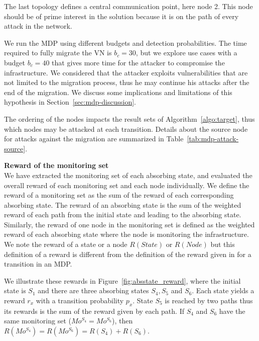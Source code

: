  The last topology defines a central communication point, here node 2. This node should be of prime interest in the solution because it is on the path of every attack in the network.



We run the MDP using different budgets and detection probabilities.
The time required to fully migrate the VN is $b_c=30$, but we explore use cases with a budget $b_c=40$ that gives more time for the attacker to compromise the infrastructure. We considered that the attacker exploits vulnerabilities that are not limited to the migration process, thus he may continue his attacks after the end of the migration. We discuss some implications and limitations of this hypothesis in Section~\ref{sec:mdp-discussion}.

The ordering of the nodes impacts the result sets of Algorithm~\ref{algo:target}, thus which nodes may be attacked at each transition.
Details about the source node for attacks against the migration are summarized in Table~\ref{tab:mdp-attack-source}.



\textbf{Reward of the monitoring set\\}
We have extracted the monitoring set of each absorbing state, and evaluated the overall reward of each monitoring set and each node individually.
We define the reward of a monitoring set as the sum of the reward of each corresponding absorbing state.
The reward of an absorbing state is the sum of the weighted reward of each path from the initial state and leading to the absorbing state. Similarly, the reward of one node in the monitoring set is defined as the weighted reward of each absorbing state where the node is monitoring the infrastructure.
We note the reward of a state or a node $R(State)$ or $R(Node)$ but this definition of a reward is different from the definition of the reward given in for a transition in an MDP.

We illustrate these rewards in Figure~\ref{fig:absstate_reward}, where the initial state is $S_1$ and there are three absorbing states $S_4,S_5$ and $S_6$. Each state yields a reward $r_x$ with a transition probability $p_x$.
State $S_5$ is reached by two paths thus its rewards is the sum of the reward given by each path.
If $S_4$ and $S_6$ have the same monitoring set (\ie $Mo^{S_4} = Mo^{S_6}$), then $R(Mo^{S_4}) = R(Mo^{S_6}) = R(S_4) + R(S_6)$.


